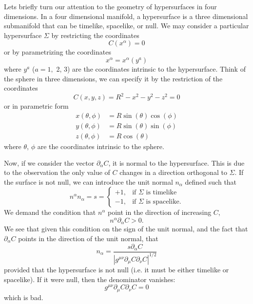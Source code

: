 
Lets briefly turn our attention to the geometry of hypersurfaces
in four dimensions. In a four dimensional manifold, a
hypersurface is a three dimensional submanifold that can be
timelike, spacelike, or null. We may consider a particular
hypersurface $\Sigma$ by restricting the coordinates
\begin{equation}%
C(x^{\alpha})=0
\end{equation}
or by parametrizing the coordinates
\begin{equation}%
x^{\alpha} = x^{\alpha}(y^a)
\end{equation}
where $y^a$ ($a=1,$ 2, 3) are the coordinates intrinsic to the
hypersurface. Think of the sphere in three dimensions, we can
specify it by the restriction of the coordinates
\begin{equation}%
C(x,y,z) = R^2-x^2-y^2-z^2 = 0
\end{equation}
or in parametric form
\begin{subequations}
\begin{align}
x(\theta,\phi) &= R\sin(\theta)\cos(\phi)\\
y(\theta,\phi) &= R\sin(\theta)\sin(\phi)\\
z(\theta,\phi) &= R\cos(\theta)
\end{align}
\end{subequations}
where $\theta$, $\phi$ are the coordinates intrinsic to the sphere.

 Now, if we consider the vector $\partial_{\alpha}C$, it is normal
to the hypersurface. This is due to the observation the only
value of $C$ changes in a direction orthogonal to $\Sigma$. If
the surface is not null, we can introduce the unit normal
$n_{\alpha}$ defined such that
\begin{equation}%
n^{\alpha}n_{\alpha} = s = \begin{cases}+1,&\text{if $\Sigma$ is timelike}\\
-1,&\text{if $\Sigma$ is spacelike.}\end{cases}
\end{equation}
We demand the condition that $n^\alpha$ point in the direction of
increasing $C$,
\begin{equation}%
n^{\alpha}\partial_{\alpha} C > 0.
\end{equation}
We see that given this condition on the sign of the unit normal,
and the fact that $\partial_{\alpha}C$ points in the direction of
the unit normal, that
\begin{equation}%
n_{\alpha} = \frac{s\partial_{\alpha}C}{|g^{\mu\nu}\partial_{\mu}C\partial_{\nu}C|^{1/2}}
\end{equation}
provided that the hypersurface is not null (i.e. it must be
either timelike or spacelike). If it were null, then the
denominator vanishes:
\begin{equation}%
g^{\mu\nu}\partial_{\mu}C\partial_{\nu}C=0
\end{equation}
which is bad.

